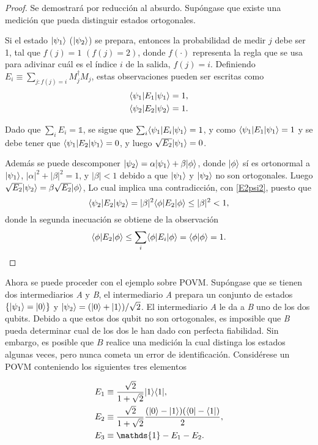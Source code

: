 \begin{proof}
Se demostrará por reducción al absurdo. Supóngase que existe una medición que pueda distinguir estados ortogonales.

Si el estado $|\psi_1\rangle $ ($|\psi_2\rangle $) se prepara, entonces la
probabilidad de medir $j$ debe ser 1, tal que  $f(j) =1$ $(f(j)=2)$, donde $f(\cdot)$ representa
la regla que se usa para adivinar cuál es el índice $i$ de la salida, $f(j)=i$. 
Definiendo $E_i\equiv \sum_{j:f(j)=i}M_j^\dagger M_j$, estas observaciones pueden ser escritas como 
\begin{align}
	\langle \psi_1|E_1|\psi_1\rangle=1, \label{E1psi1} \\
	\langle \psi_2|E_2|\psi_2\rangle=1\label{E2psi2}.
\end{align}

Dado que $\sum_i E_i=\mathds{1}$, se sigue que $\sum_i \langle \psi_1|E_i|\psi_1\rangle=1$,
y como $\langle \psi_1|E_1|\psi_1\rangle=1$ y se debe tener que $\langle \psi_1|E_2|\psi_1\rangle=0$,
y luego $\sqrt{E_2}|\psi_1\rangle=0$. 


Además se puede descomponer  
$|\psi_2\rangle=\alpha|\psi_1\rangle +\beta|\phi\rangle$, donde $|\phi\rangle$ sí es ortonormal
a $|\psi_1\rangle $, $|\alpha|^2+|\beta|^2=1$, y $|\beta|<1$ debido a que $|\psi_1\rangle$
y $|\psi_2\rangle$ no son ortogonales. Luego $\sqrt{E_2}|\psi_2\rangle=\beta \sqrt{E_2}|\phi\rangle$, Lo
cual implica una contradicción, con {\ref{E2psi2}}, puesto que \begin{equation}
	\langle \psi_2|E_2|\psi_2\rangle=|\beta|^2 \langle\phi|E_2|\phi\rangle \le |\beta|^2<1,
\end{equation} 
donde la segunda inecuación se obtiene de la observación \[ \langle \phi|E_2|\phi\rangle \le \sum_i\langle \phi|E_i|\phi\rangle= \langle\phi|\phi\rangle=1. \]
\end{proof}
Ahora se puede proceder con el ejemplo sobre POVM\@. Supóngase que se tienen dos intermediarios \textit{A} y \textit{B}, el intermediario \textit{A} prepara un conjunto de estados $\{|\psi_1\rangle=|0\rangle\}$ y $|\psi_2\rangle=(|0\rangle +|1\rangle)/\sqrt{2}$. El intermediario \textit{A} le da a \textit{B} uno de los dos qubits. Debido a que estos dos qubit no son ortogonales, es imposible que \textit{B} pueda determinar cual de los dos le han dado con perfecta fiabilidad. Sin embargo, es posible que $B$ realice una medición la cual distinga los estados algunas veces, pero nunca cometa un error de identificación. Considérese un POVM conteniendo los siguientes tres elementos 

	\begin{align}
		E_1 & \equiv \dfrac{\sqrt{2}}{1+\sqrt{2}} |1\rala1|, \label{eq11} \\
		E_2 & \equiv \dfrac{\sqrt{2}}{1+\sqrt{2}} \dfrac{(|0\ra -|1\ra)(\la0|-\la1|)}{2}, \label{eq12} \\
		E_3 & \equiv \mathds{1}-E_1-E_2\label{eq13}. 
	\end{align}



